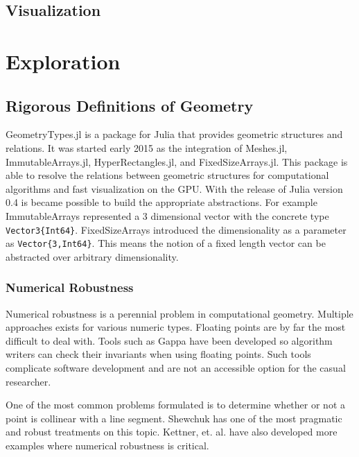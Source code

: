 \documentclass[a4paper]{article}
\begin{document}
\subsection{Visualization}
\cite{Tupper_2001}
\cite{Hijazi_Knoll_Schott_Kensler_Hansen_Hagen_2008}

\section{Exploration}

\subsection{Rigorous Definitions of Geometry}

GeometryTypes.jl is a package for Julia that provides geometric structures and
relations. It was started early 2015 as the integration of Meshes.jl,
ImmutableArrays.jl, HyperRectangles.jl, and FixedSizeArrays.jl. This package
is able to resolve the relations between geometric structures for
computational algorithms and fast visualization on the GPU. With the
release of Julia version 0.4 is became possible to build the appropriate
abstractions. For example ImmutableArrays represented a 3 dimensional
vector with the concrete type \texttt{Vector3\{Int64\}}. FixedSizeArrays introduced
the dimensionality as a parameter as \texttt{Vector\{3,Int64\}}. This means the notion
of a fixed length vector can be abstracted over arbitrary dimensionality.

\cite{Pasko_Adzhiev_Comninos_2008}

\subsubsection{Numerical Robustness}

Numerical robustness is a perennial problem in computational geometry. Multiple
approaches exists for various numeric types. Floating points are by far
the most difficult to deal with. Tools such as Gappa have been developed so
algorithm writers can check their invariants when using floating points. \cite{Gappa}
Such tools complicate software development and are not an accessible option
for the casual researcher.

One of the most common problems formulated is to determine whether or not a
point is collinear with a line segment. Shewchuk has one of the most pragmatic
and robust treatments on this topic.\cite{Shewchuk} Kettner, et. al. have also
developed more examples where numerical robustness is critical. \cite{Kettner_Mehlhorn_Pion_Schirra_Yap_2008}
\end{document}
